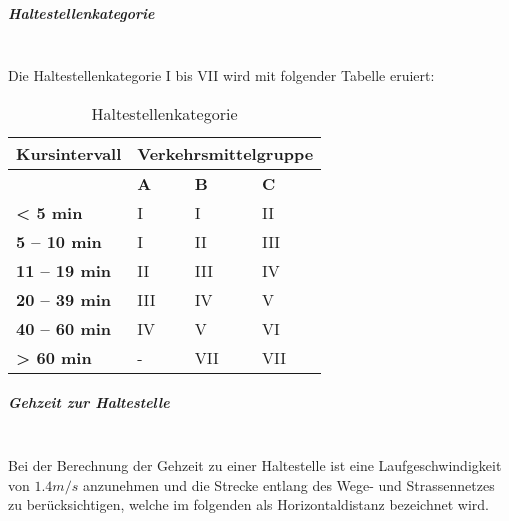 \subparagraph{Haltestellenkategorie}~\\
\label{Berechnungsmethodik OeVGK18:Haltestellenkategorie}
Die Haltestellenkategorie I bis VII wird mit folgender Tabelle eruiert:

\begin{table}[H]
    \begin{tabular}[c]{l p{4.0cm} p{4.0cm} p{4.0cm}}
        \toprule
        \textbf{Kursintervall}
                                & \multicolumn{3}{c}{\textbf{Verkehrsmittelgruppe}}\\
        \midrule
        \textbf{}
                                & \textbf{A}
                                & \textbf{B}
                                & \textbf{C}\\
        \textbf{< 5 min}
                                & I
                                & I
                                & II\\
        \textbf{5 -- 10 min}
                                & I
                                & II
                                & III\\
        \textbf{11 -- 19 min}
                                & II
                                & III
                                & IV\\
        \textbf{20 -- 39 min}
                                & III
                                & IV
                                & V\\
        \textbf{40 -- 60 min}
                                & IV
                                & V
                                & VI\\
        \textbf{> 60 min}
                                & -
                                & VII
                                & VII\\
        \bottomrule
    \end{tabular}
    \caption{Haltestellenkategorie}
    \label{Haltestellenkategorie}
\end{table}

\subparagraph{Gehzeit zur Haltestelle}~\\
\label{Berechnungsmethodik OeVGK18:Distanz zur Haltestelle}
Bei der Berechnung der Gehzeit zu einer Haltestelle ist eine Laufgeschwindigkeit von $1.4 m/s$ anzunehmen und die Strecke entlang des Wege- und Strassennetzes zu berücksichtigen, welche im folgenden als Horizontaldistanz bezeichnet wird.

